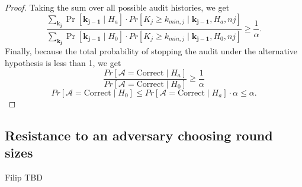 \begin{proof}
Taking the sum over all possible audit histories, we get
$$
\frac{\sum_{\bm{k_j}}\Pr[\bm{k_{j-1}} \mid H_a]\cdot Pr[K_{j} \ge k_{min, j} \mid \bm{k_{j-1}}, H_a, n{j}]}{\sum_{\bm{k_j}}\Pr[\bm{k_{j-1}} \mid H_0]\cdot Pr[K_{j} \ge k_{min, j} \mid \bm{k_{j-1}}, H_0, n{j}]}\ge \frac{1}{\alpha}.
$$
Finally, because the total probability of stopping the audit under
the alternative hypothesis is less than 1, we get
$$
\frac{Pr[\mathcal{A}=\text{Correct} \mid H_a]}{Pr[\mathcal{A}=\text{Correct} \mid H_0]}\ge \frac{1}{\alpha}
$$
$$
Pr[\mathcal{A}=\text{Correct} \mid H_0]
\le
Pr[\mathcal{A}=\text{Correct} \mid H_a] \cdot \alpha
\le
\alpha.
$$
\end{proof}

\subsection{Resistance to an adversary choosing round sizes}
\label{sec:adversary}
Filip TBD

